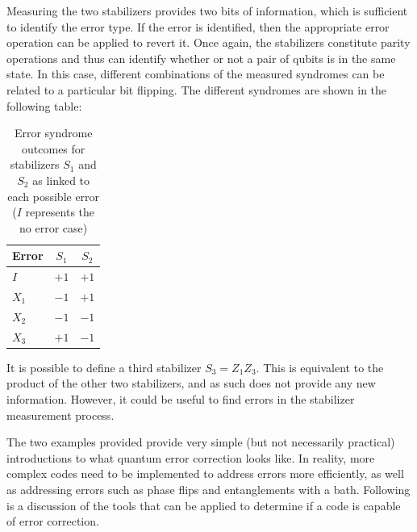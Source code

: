 Measuring the two stabilizers provides two bits of information, which is sufficient to identify the error type. If the error is identified, then the appropriate error operation can be applied to revert it. Once again, the stabilizers constitute parity operations and thus can identify whether or not a pair of qubits is in the same state. In this case, different combinations of the measured syndromes can be related to a particular bit flipping. The different syndromes are shown in the following table:
\begin{table}[hbt!]
    \centering
    \begin{tabular}{ l || c | c}
        Error & $S_1$ & $S_2$ \\ 
         \hline \hline
         $I$ & $+1$ & $+1$ \\ 
         $X_1$ & $-1$ & $+1$\\ 
         $X_2$ & $-1$ & $-1$\\
         $X_3$ & $+1$ & $-1$
    \end{tabular}
\caption[Error syndrome outcomes for stabilizers in the three-qubit code]{Error syndrome outcomes for stabilizers $S_1$ and $S_2$ as linked to each possible error ($I$ represents the no error case)}
\end{table}

It is possible to define a third stabilizer $S_3=Z_1Z_3$. This is equivalent to the product of the other two stabilizers, and as such does not provide any new information. However, it could be useful to find errors in the stabilizer measurement process.

The two examples provided provide very simple (but not necessarily practical) introductions to what quantum error correction looks like. In reality, more complex codes need to be implemented to address errors more efficiently, as well as addressing errors such as phase flips and entanglements with a bath. Following is a discussion of the tools that can be applied to determine if a code is capable of error correction.

